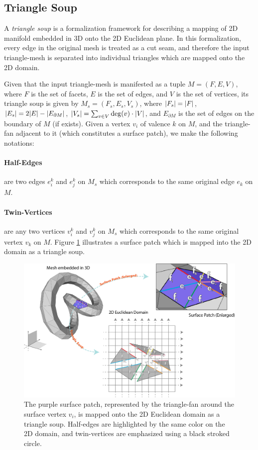 \subsection{Triangle Soup}
A \emph{triangle soup} is a formalization framework for describing a mapping of 2D manifold embedded in 3D onto the 2D Euclidean plane. In this formalization, every edge in the original mesh is treated as a cut seam, and therefore the input triangle-mesh is separated into individual triangles which are mapped onto the 2D domain.

\noindent Given that the input triangle-mesh is manifested as a tuple $M = (F,E,V)$, where $F$ is the set of facets, $E$ is the set of edges, and $V$ is the set of vertices, its triangle soup is given by $M_s = (F_s,E_s,V_s)$, where $\lvert F_s\rvert = \lvert F\rvert$, $\lvert E_s\rvert = 2\lvert E\rvert - \lvert E_{\partial M}\rvert$, $\lvert V_s\rvert = \sum_{v \in V} \mathrm{deg}(v) \cdot\lvert V\rvert$, and $E_{\partial M}$ is the set of edges on the boundary of $M$ (if exists). Given a vertex $v_i$ of valence $k$ on $M$, and the triangle-fan adjacent to it (which constitutes a surface patch), we make the following notations:
\paragraph{Half-Edges} are two edges $e_i^k$ and $e_j^k$ on $M_s$ which corresponds to the same original edge $e_k$ on $M$.
\paragraph{Twin-Vertices} are any two vertices $v_i^k$ and $v_j^k$ on $M_s$ which corresponds to the same original vertex $v_k$ on $M$.
\noindent Figure \ref{fig:triangle_soup} illustrates a surface patch which is mapped into the 2D domain as a triangle soup.
\begin{figure}[ht]
\centering
\includegraphics[width=16cm]{figures/triangle_soup.png}
\caption[Triangle Soup]{The purple surface patch, represented by the triangle-fan around the surface vertex $v_i$, is mapped onto the 2D Euclidean domain as a triangle soup. Half-edges are highlighted by the same color on the 2D domain, and twin-vertices are emphasized using a black stroked circle.}
\label{fig:triangle_soup}
\end{figure}
